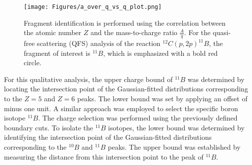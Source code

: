 \begin{figure}[htpb]
    \centering
    \texttt{[image: Figures/a\_over\_q\_vs\_q\_plot.png]}
    \caption{
	Fragment identification is performed using the correlation between the atomic number $Z$ and the mass-to-charge ratio $\frac{A}{q}$. For the quasi-free scattering (QFS) analysis of the reaction $^{12}C(p,2p)^{11}B$, the fragment of interest is $^{11}B$, which is emphasized with a bold red circle.
    }
    \label{fig:a_q_vs_q}
\end{figure}
For this qualitative analysis, the upper charge bound of $^{11}B$ was determined by locating the intersection point of the Gaussian-fitted distributions corresponding to the $Z=5$ and $Z=6$ peaks. The lower bound was set by applying an offset of minus one unit.\newline
A similar approach was employed to select the specific boron isotope $^{11}B$. The charge selection was performed using the previously defined boundary cuts. To isolate the $^{11}B$ isotopes, the lower bound was determined by identifying the intersection point of the Gaussian-fitted distributions corresponding to the $^{10}B$ and $^{11}B$ peaks. The upper bound was established by measuring the distance from this intersection point to the peak of $^{11}B$.

